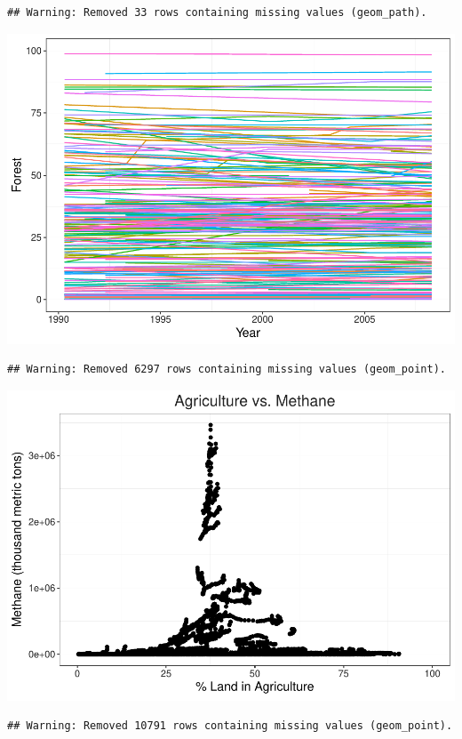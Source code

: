 \documentclass[12pt,]{article}
\begin{document}
\begin{verbatim}
## Warning: Removed 33 rows containing missing values (geom_path).
\end{verbatim}

\includegraphics{Marx_ENV872_Project_files/figure-latex/unnamed-chunk-4-1.pdf}

\begin{verbatim}
## Warning: Removed 6297 rows containing missing values (geom_point).
\end{verbatim}

\includegraphics{Marx_ENV872_Project_files/figure-latex/unnamed-chunk-5-1.pdf}

\begin{verbatim}
## Warning: Removed 10791 rows containing missing values (geom_point).
\end{verbatim}
\end{document}
